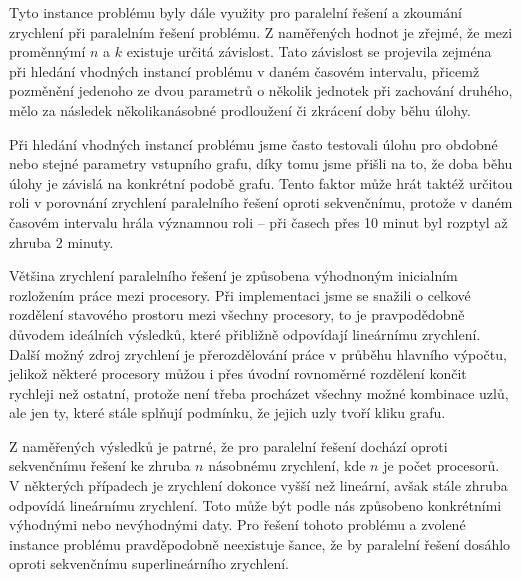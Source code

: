 \documentclass[12pt]{article}
\begin{document}
Tyto instance problému byly dále využity pro paralelní řešení a zkoumání zrychlení při paralelním řešení problému.
Z naměřených hodnot je zřejmé, že mezi proměnnýmí $n$ a $k$ existuje určitá závislost. 
Tato závislost se projevila zejména při hledání vhodných instancí problému v daném časovém intervalu, 
přicemž pozměnění jedenoho ze dvou parametrů o několik jednotek při zachování druhého, mělo za následek
několikanásobné prodloužení či zkrácení doby běhu úlohy.

Při hledání vhodných instancí problému jsme často testovali úlohu pro obdobné nebo stejné parametry vstupního grafu,
díky tomu jsme přišli na to, že doba běhu úlohy je závislá na konkrétní podobě grafu.
Tento faktor může hrát taktéž určitou roli v porovnání zrychlení paralelního řešení oproti sekvenčnímu, 
protože v daném časovém intervalu hrála významnou roli -- při časech přes 10 minut byl rozptyl až zhruba 2 minuty.

Většina zrychlení paralelního řešení je způsobena výhodnoným inicialním rozložením práce mezi procesory.
Při implementaci jsme se snažili o celkové rozdělení stavového prostoru mezi všechny procesory, to je pravpodědobně důvodem ideálních výsledků, které přibližně odpovídají lineárnímu zrychlení.
Další možný zdroj zrychlení je přerozdělování práce v průběhu hlavního výpočtu, jelikož některé procesory můžou i přes 
úvodní rovnoměrné rozdělení končit rychleji než ostatní, protože není třeba procházet všechny možné kombinace uzlů,
ale jen ty, které stále splňují podmínku, že jejich uzly tvoří kliku grafu.

Z naměřených výsledků je patrné, že pro paralelní řešení dochází oproti sekvenčnímu
řešení ke zhruba $n$ násobnému zrychlení, kde $n$ je počet procesorů. 
V některých případech je zrychlení dokonce vyšší než lineární, avšak stále zhruba odpovídá lineárnímu zrychlení.
Toto může být podle nás způsobeno konkrétními výhodnými nebo nevýhodnými daty. 
Pro řešení tohoto problému a zvolené instance problému pravděpodobně neexistuje
šance, že by paralelní řešení dosáhlo oproti sekvenčnímu superlineárního zrychlení.
\end{document}
